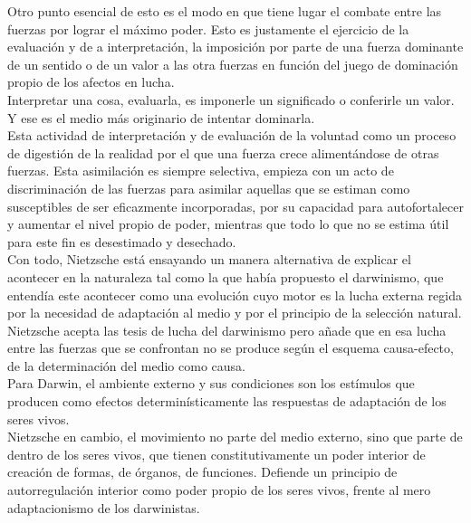 \documentclass[a4paper, 10pt, twocolumn, spanish]{article}
\begin{document}
Otro punto esencial de esto es el modo en que tiene lugar el combate
entre las fuerzas por lograr el máximo poder. Esto es justamente el
ejercicio de la evaluación y de a interpretación, la imposición por
parte de una fuerza dominante de un sentido o de un valor a las otra
fuerzas en función del juego de dominación propio de los afectos en
lucha.\\[0pt]
Interpretar una cosa, evaluarla, es imponerle un significado o
conferirle un valor. Y ese es el medio más originario de intentar
dominarla.\\[0pt]
Esta actividad de interpretación y de evaluación de la voluntad como
un proceso de digestión de la realidad por el que una fuerza crece
alimentándose de otras fuerzas. Esta asimilación es siempre selectiva,
empieza con un acto de discriminación de las fuerzas para asimilar
aquellas que se estiman como susceptibles de ser eficazmente
incorporadas, por su capacidad para autofortalecer y aumentar el nivel
propio de poder, mientras que todo lo que no se estima útil para este
fin es desestimado y desechado.\\[0pt]

Con todo, Nietzsche está ensayando un manera alternativa de explicar
el acontecer en la naturaleza tal como la que había propuesto el
darwinismo, que entendía este acontecer como una evolución cuyo motor
es la lucha externa regida por la necesidad de adaptación al medio y
por el principio de la selección natural.\\[0pt]
Nietzsche acepta las tesis de lucha del darwinismo pero añade que en
esa lucha entre las fuerzas que se confrontan no se produce según el
esquema causa-efecto, de la determinación del medio como causa.\\[0pt]
Para Darwin, el ambiente externo y sus condiciones son los estímulos
que producen como efectos determinísticamente las respuestas de
adaptación de los seres vivos.\\[0pt]
Nietzsche en cambio, el movimiento no parte del medio externo, sino
que parte de dentro de los seres vivos, que tienen constitutivamente
un poder interior de creación de formas, de órganos, de
funciones. Defiende un principio de autorregulación interior como
poder propio de los seres vivos, frente al mero adaptacionismo de los
darwinistas.\\[0pt]
\end{document}
